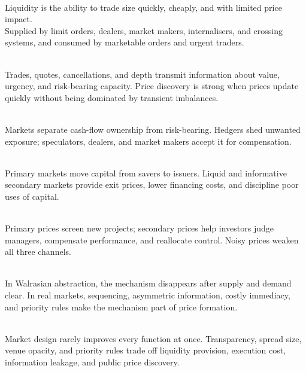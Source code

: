 \begin{definition} \\
Liquidity is the ability to trade size quickly, cheaply, and with limited price impact.\\
Supplied by limit orders, dealers, market makers, internalisers, and crossing systems, and consumed by marketable orders and urgent traders.
\end{definition}

\begin{mechanism} \\
Trades, quotes, cancellations, and depth transmit information about value, urgency, and risk-bearing capacity. Price discovery is strong when prices update quickly without being dominated by transient imbalances.
\end{mechanism}

\begin{mechanism} \\
Markets separate cash-flow ownership from risk-bearing. Hedgers shed unwanted exposure; speculators, dealers, and market makers accept it for compensation.
\end{mechanism}

\begin{principle} \\
Primary markets move capital from savers to issuers. Liquid and informative secondary markets provide exit prices, lower financing costs, and discipline poor uses of capital.
\end{principle}

\begin{mechanism} \\
Primary prices screen new projects; secondary prices help investors judge managers, compensate performance, and reallocate control. Noisy prices weaken all three channels.
\end{mechanism}

\begin{principle} \\
In Walrasian abstraction, the mechanism disappears after supply and demand clear. In real markets, sequencing, asymmetric information, costly immediacy, and priority rules make the mechanism part of price formation.
\end{principle}

\begin{caveat} \\
Market design rarely improves every function at once. Transparency, spread size, venue opacity, and priority rules trade off liquidity provision, execution cost, information leakage, and public price discovery.
\end{caveat}
